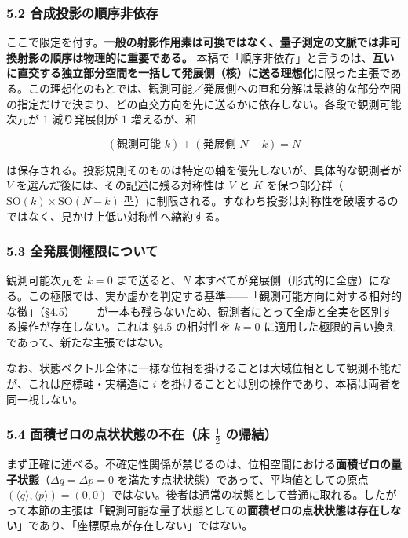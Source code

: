 \documentclass[
]{ltjsarticle}
\begin{document}
\subsubsection{5.2
合成投影の順序非依存}\label{ux5408ux6210ux6295ux5f71ux306eux9806ux5e8fux975eux4f9dux5b58}

ここで限定を付す。\textbf{一般の射影作用素は可換ではなく、量子測定の文脈では非可換射影の順序は物理的に重要である。}
本稿で「順序非依存」と言うのは、\textbf{互いに直交する独立部分空間を一括して発展側（核）に送る理想化}に限った主張である。この理想化のもとでは、観測可能／発展側への直和分解は最終的な部分空間の指定だけで決まり、どの直交方向を先に送るかに依存しない。各段で観測可能次元が
\(1\) 減り発展側が \(1\) 増えるが、和

\[(\text{観測可能 }k)+(\text{発展側 }N-k)=N\]

は保存される。投影規則そのものは特定の軸を優先しないが、具体的な観測者が
\(V\) を選んだ後には、その記述に残る対称性は \(V\) と \(K\)
を保つ部分群（\(\mathrm{SO}(k)\times\mathrm{SO}(N-k)\)
型）に制限される。すなわち投影は対称性を破壊するのではなく、見かけ上低い対称性へ縮約する。

\subsubsection{5.3
全発展側極限について}\label{ux5168ux767aux5c55ux5074ux6975ux9650ux306bux3064ux3044ux3066}

観測可能次元を \(k=0\) まで送ると、\(N\)
本すべてが発展側（形式的に全虚）になる。この極限では、実か虚かを判定する基準------「観測可能方向に対する相対的な徴」（§4.5）------が一本も残らないため、観測者にとって全虚と全実を区別する操作が存在しない。これは
§4.5 の相対性を \(k=0\)
に適用した極限的言い換えであって、新たな主張ではない。

なお、状態ベクトル全体に一様な位相を掛けることは大域位相として観測不能だが、これは座標軸・実構造に
\(i\) を掛けることとは別の操作であり、本稿は両者を同一視しない。

\subsubsection{\texorpdfstring{5.4 面積ゼロの点状状態の不在（床
\(\tfrac12\)
の帰結）}{5.4 面積ゼロの点状状態の不在（床 \textbackslash tfrac12 の帰結）}}\label{ux9762ux7a4dux30bcux30edux306eux70b9ux72b6ux72b6ux614bux306eux4e0dux5728ux5e8a-tfrac12-ux306eux5e30ux7d50}

まず正確に述べる。不確定性関係が禁じるのは、位相空間における\textbf{面積ゼロの量子状態}（\(\Delta q=\Delta p=0\)
を満たす点状状態）であって、平均値としての原点
\((\langle q\rangle,\langle p\rangle)=(0,0)\)
ではない。後者は通常の状態として普通に取れる。したがって本節の主張は「観測可能な量子状態としての\textbf{面積ゼロの点状状態は存在しない}」であり、「座標原点が存在しない」ではない。
\end{document}
